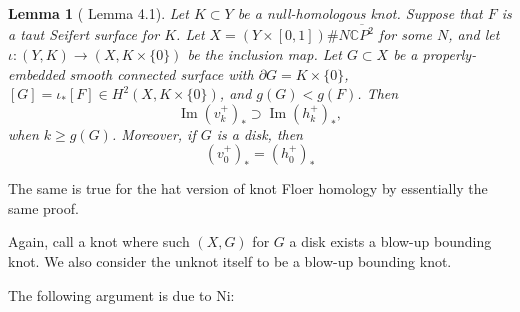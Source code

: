 \documentclass{article}
\newtheorem{lemma}[equation]{Lemma}
\theoremstyle{remark}
\numberwithin{equation}{section}
\numberwithin{table}{section}
\DeclareMathOperator{\im}{Im}
\renewcommand{\(}{\left(}
\renewcommand{\)}{\right)}
\newcommand{\C}{{\mathbb{C}}}
\begin{document}
\begin{figure}[h]
\centering
{}
\caption{}
\label{fig:v-hat-not-isomorphism}
\end{figure}





\begin{lemma}[\cite{ni-property-g} Lemma 4.1]\label{lem:blow-up-unknot-prop}
Let $K\subset Y$ be a null-homologous knot. Suppose that $F$ is a taut Seifert surface for $K$. Let $X=(Y\times[0,1])\# N\overline{\C P^2}$ for some $N$, and let $\iota:(Y,K)\to(X,K\times\{0\})$ be the inclusion map. Let $G\subset X$ be a properly-embedded smooth connected surface with $\partial G=K\times\{0\}$, $[G]=\iota_*[F]\in H^2(X,K\times\{0\})$, and $g(G)<g(F)$. Then $$\im(v_k^+)_*\supset \im(h_k^+)_*,$$ when $k\ge g(G)$. Moreover, if $G$ is a disk, then
$$(v_0^+)_*=(h_0^+)_*$$
\end{lemma}

The same is true for the hat version of knot Floer homology by essentially the same proof.

Again, call a knot where such $(X,G)$ for $G$ a disk exists a blow-up bounding knot. We also consider the unknot itself to be a blow-up bounding knot.

The following argument is due to Ni:
\end{document}
